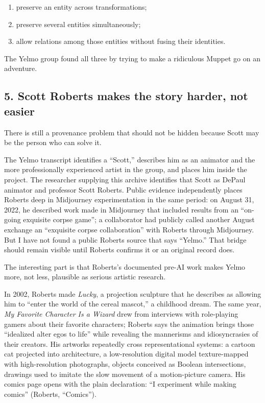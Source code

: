 \documentclass[
]{article}
\providecommand{\tightlist}{%
  \setlength{\itemsep}{0pt}\setlength{\parskip}{0pt}}
\begin{document}
\begin{enumerate}
\def\labelenumi{\arabic{enumi}.}
\tightlist
\item
  preserve an entity across transformations;
\item
  preserve several entities simultaneously;
\item
  allow relations among those entities without fusing their identities.
\end{enumerate}

The Yelmo group found all three by trying to make a ridiculous Muppet go
on an adventure.

\subsection{5. Scott Roberts makes the story harder, not
easier}\label{scott-roberts-makes-the-story-harder-not-easier}

There is still a provenance problem that should not be hidden because
Scott may be the person who can solve it.

The Yelmo transcript identifies a ``Scott,'' describes him as an
animator and the more professionally experienced artist in the group,
and places him inside the project. The researcher supplying this archive
identifies that Scott as DePaul animator and professor Scott Roberts.
Public evidence independently places Roberts deep in Midjourney
experimentation in the same period: on August 31, 2022, he described
work made in Midjourney that included results from an ``on-going
exquisite corpse game''; a collaborator had publicly called another
August exchange an ``exquisite corpse collaboration'' with Roberts
through Midjourney. But I have not found a public Roberts source that
says ``Yelmo.'' That bridge should remain visible until Roberts confirms
it or an original record does.

The interesting part is that Roberts's documented pre-AI work makes
Yelmo more, not less, plausible as serious artistic research.

In 2002, Roberts made \emph{Lucky}, a projection sculpture that he
describes as allowing him to ``enter the world of the cereal mascot,'' a
childhood dream. The same year, \emph{My Favorite Character Is a Wizard}
drew from interviews with role-playing gamers about their favorite
characters; Roberts says the animation brings those ``idealized alter
egos to life'' while revealing the mannerisms and idiosyncrasies of
their creators. His artworks repeatedly cross representational systems:
a cartoon cat projected into architecture, a low-resolution digital
model texture-mapped with high-resolution photographs, objects conceived
as Boolean intersections, drawings used to imitate the slow movement of
a motion-picture camera. His comics page opens with the plain
declaration: ``I experiment while making comics'' (Roberts, ``Comics'').
\end{document}
